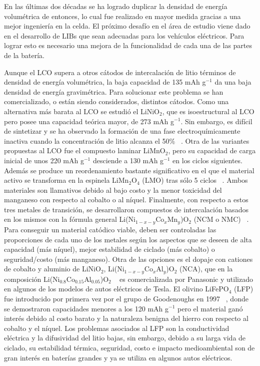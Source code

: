 En las últimas dos décadas se ha logrado duplicar la densidad de energía 
volumétrica de entonces, lo cual fue realizado en mayor medida gracias a una 
mejor ingeniería en la celda. El próximo desafío en el área de estudio viene 
dado en el desarrollo de LIBs que sean adecuadas para los vehículos eléctricos. 
Para lograr esto es necesario una mejora de la funcionalidad de cada una de las
partes de la batería.

Aunque el LCO supera a otros cátodos de intercalación de litio términos de 
densidad de energía volumétrica, la baja capacidad de 135 mAh g$^{-1}$ da una baja
densidad de energía gravimétrica. Para solucionar este problema se han 
comercializado, o están siendo considerados, distintos cátodos. Como una 
alternativa más barata al LCO se estudió el LiNiO$_2$, que es isoestructural al 
LCO pero posee una capacidad teórica mayor, de 273 mAh g$^{-1}$. Sin embargo,
es difícil de sintetizar y se ha observado la formación de una fase 
electroquímicamente inactiva cuando la concentración de litio alcanza el 50\% 
~\cite{ohzuku1993}. Otra de las variantes propuestas al LCO fue el compuesto 
laminar LiMnO$_2$, pero su capacidad de carga inicial de unos 220 mAh g$^{-1}$ 
desciende a 130 mAh g$^{-1}$ en los ciclos siguientes. Además se produce un 
reordenamiento bastante significativo en el que el material activo se transforma 
en la espinela LiMn$_2$O$_4$ (LMO) tras sólo 5 ciclos ~\cite{shao1999, shin2004}.
Ambos materiales son llamativos debido al bajo costo y la menor toxicidad del 
manganeso con respecto al cobalto o al níquel. Finalmente, con respecto a estos 
tres metales de transición, se desarrollaron compuestos de intercalación basados
en los mismos con la fórmula general Li(Ni$_{1-x-y}$Co$_x$Mn$_y$)O$_2$ (NCM o NMC)
~\cite{liu1999}. Para conseguir un material catódico viable, deben ser controladas
las proporciones de cada uno de los metales según los aspectos que se deseen de 
alta capacidad (más níquel), mejor estabilidad de ciclado (más cobalto) o 
seguridad/costo (más manganeso). Otra de las opciones es el dopaje con cationes
de cobalto y aluminio de LiNiO$_2$, Li(Ni$_{1-x-y}$Co$_x$Al$_y$)O$_2$ (NCA),
que en la composición Li(Ni$_{0.8}$Co$_{0.15}$Al$_{0.05}$)O$_2$ ~\cite{chen2004}
es comercializada por Panasonic y utilizado en algunos de los modelos de autos 
eléctricos de Tesla. El olivino LiFePO$_4$ (LFP) fue introducido por primera vez
por el grupo de Goodenoughs en 1997 ~\cite{padhi1997}, donde se demostraron 
capacidades menores a los 120 mAh g$^{-1}$ pero el material ganó interés debido
al costo barato y la naturaleza benigna del hierro con respecto al cobalto y el
níquel. Los problemas asociados al LFP son la conductividad eléctrica y la 
difusividad del litio bajas, sin embargo, debido a su larga vida de ciclado, su
estabilidad térmica, seguridad, costo e impacto medioambiental son de gran 
interés en baterías grandes y ya se utiliza en algunos autos eléctricos.

